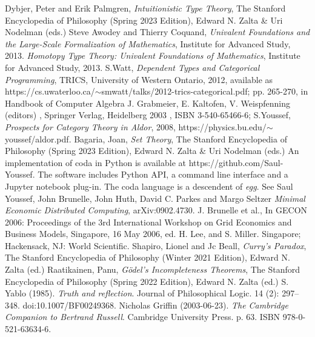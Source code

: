 \documentclass[11pt]{article}
\begin{document}
\begin{thebibliography}{10}
 Dybjer, Peter and Erik Palmgren, {\it Intuitionistic Type Theory}, The Stanford Encyclopedia of Philosophy (Spring 2023 Edition), Edward N. Zalta \& Uri Nodelman (eds.)
 Steve Awodey and Thierry Coquand, {\it Univalent Foundations and the Large-Scale Formalization of Mathematics}, Institute for Advanced Study, 2013.
 {\it Homotopy Type Theory: Univalent Foundations of Mathematics}, Institute for Advanced Study, 2013.
 S.Watt, {\it Dependent Types and Categorical Programming}, TRICS, University of Western Ontario, 2012, available as {\rm https://cs.uwaterloo.ca/}$\sim${\rm smwatt/talks/2012-trics-categorical.pdf}; pp. 265-270, in Handbook of Computer Algebra J. Grabmeier, E. Kaltofen, V. Weispfenning (editors) , Springer Verlag, Heidelberg 2003 , ISBN 3-540-65466-6; S.Youssef, {\it Prospects for Category Theory in Aldor}, 2008, {\rm https://physics.bu.edu/}$\sim${\rm youssef/aldor.pdf}.
 Bagaria, Joan, {\it Set Theory}, The Stanford Encyclopedia of Philosophy (Spring 2023 Edition), Edward N. Zalta \& Uri Nodelman (eds.)
 An implementation of coda in Python is available at {\rm https://github.com/Saul-Youssef}.  The software includes Python API, a command line 
interface and a Jupyter notebook plug-in.  
 The coda language is a descendent of {\it egg}.  See Saul Youssef, John Brunelle, John Huth, David C. Parkes and Margo Seltzer {\it Minimal Economic Distributed Computing}, arXiv:0902.4730.  J. Brunelle et al., In GECON 2006: Proceedings of the 3rd International Workshop on Grid Economics and Business Models, Singapore, 16 May 2006, ed. H. Lee, and S. Miller. Singapore; Hackensack, NJ: World Scientific.
 Shapiro, Lionel and Jc Beall, {\it Curry’s Paradox}, The Stanford Encyclopedia of Philosophy (Winter 2021 Edition), Edward N. Zalta (ed.)
 Raatikainen, Panu, {\it Gödel’s Incompleteness Theorems}, The Stanford Encyclopedia of Philosophy (Spring 2022 Edition), Edward N. Zalta (ed.)
 S. Yablo (1985). {\it Truth and reflection}. Journal of Philosophical Logic. 14 (2): 297–348. doi:10.1007/BF00249368.
 Nicholas Griffin (2003-06-23). {\it The Cambridge Companion to Bertrand Russell}. Cambridge University Press. p. 63. ISBN 978-0-521-63634-6.
\end{thebibliography}
\end{document}
